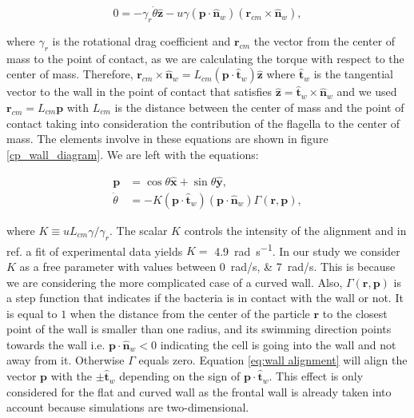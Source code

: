 \begin{equation} \label{eq:deduction_of_K}
    0 = - \gamma_r \dot{\theta} \hat{\textbf{z}} - u \gamma (\textbf{p} \cdot \hat{\textbf{n}}_w) (\textbf{r}_{cm} \times \hat{\textbf{n}}_w),
\end{equation}

where $\gamma_r$ is the rotational drag coefficient and $\textbf{r}_{cm}$ the vector from the center of mass to the point of contact, as we are calculating the torque with respect to the center of mass. Therefore, $\textbf{r}_{cm} \times \hat{\textbf{n}}_w = L_{cm} (\textbf{p} \cdot \hat{\textbf{t}}_w) \hat{\textbf{z}}$ where $\hat{\textbf{t}}_w$ is the tangential vector to the wall in the point of contact that satisfies $\hat{\textbf{z}} = \hat{\textbf{t}}_w \times \hat{\textbf{n}}_w$  and we used $\textbf{r}_{cm} = L_{cm} \textbf{p} $ with $L_{cm}$ is the distance between the center of mass and the point of contact taking into consideration the contribution of the flagella to the center of mass. The elements involve in these equations are shown in figure \ref{cp_wall_diagram}. We are left with the equations:

\begin{align}
    \textbf{p} &= \cos{\theta}\hat{\textbf{x}}+\sin{\theta}\hat{\textbf{y}}, \\
    \dot{\theta} &= -K (\textbf{p} \cdot \hat{\textbf{t}}_w)  (\textbf{p} \cdot \hat{\textbf{n}}_w) \Gamma(\textbf{r}, \textbf{p}),
    \label{eq:wall alignment}
\end{align}

where $K\equiv u L_{cm}\gamma / \gamma_r$. The scalar $K$ controls the intensity of the alignment and in ref. \cite{Bianchi20193DInterface} a fit of experimental data yields $K=$ \SI[per-mode = symbol]{4.9}{\radian \per \second}. In our study we consider $K$ as a free parameter with values between \SIlist[per-mode = symbol, list-units=single]{0;7}{\radian\per\second}. This is because we are considering the more complicated case of a curved wall. Also, $\Gamma(\textbf{r}, \textbf{p})$ is a step function that indicates if the bacteria is in contact with the wall or not. It is equal to $1$ when the distance from the center of the particle $\textbf{r}$ to the closest point of the wall is smaller than one radius, and its swimming direction points towards the wall i.e. $\textbf{p} \cdot \hat{\textbf{n}}_w < 0$ indicating the cell is going into the wall and not away from it. Otherwise $\Gamma$ equals zero.  Equation \eqref{eq:wall alignment} will align the vector $\textbf{p}$ with the $\pm\hat{\textbf{t}}_w$ depending on the sign of $\textbf{p} \cdot \hat{\textbf{t}}_w$. This effect is only considered for the flat and curved wall as the frontal wall is already taken into account because simulations are two-dimensional.

